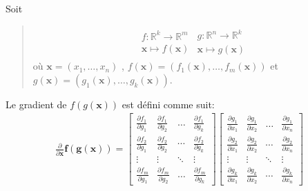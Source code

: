 \documentclass[letterpaper,11pt,english]{sphinxmanual}
\begin{document}
\begin{DUlineblock}{0em}
\item[] 
\item[] Soit
\end{DUlineblock}
\begin{quote}
\begin{equation}\label{equation:chapter2:chapter2:32}
\begin{split}\begin{array}{l}
f :\mathbb{R}^{k} \rightarrow\mathbb{R}^{m} \\
\mathbf{x} \mapsto f(\mathbf{x})
\end{array}
\begin{array}{l}
g :\mathbb{R}^{n} \rightarrow\mathbb{R}^{k} \\
\mathbf{x} \mapsto g(\mathbf{x})
\end{array}\end{split}
\end{equation}
\sphinxAtStartPar
où \(\mathbf{x}=(x_1,\dots,x_n)\) ,
\(f(\mathbf{x}) = (f_1(\mathbf{x}),\dots,f_m(\mathbf{x}))\) et
\(g(\mathbf{x}) = (g_1(\mathbf{x}),\dots,g_k(\mathbf{x}))\).
\end{quote}

\sphinxAtStartPar
Le gradient de \(f(g(\mathbf{x}))\) est défini comme suit:
\begin{equation}\label{equation:chapter2:chapter2:33}
\begin{split}\frac{\partial}{\partial \mathbf{x}} \mathbf{f}(\mathbf{g}(\mathbf{x}))=\left[\begin{array}{cccc}
\frac{\partial f_{1}}{\partial g_{1}} & \frac{\partial f_{1}}{\partial g_{2}} & \ldots & \frac{\partial f_{1}}{\partial g_{k}} \\
\frac{\partial f_{2}}{\partial g_{1}} & \frac{\partial f_{2}}{\partial g_{2}} & \cdots & \frac{\partial f_{2}}{\partial g_{k}} \\
\vdots &\vdots & \ddots & \vdots \\
\frac{\partial f_{m}}{\partial g_{1}} & \frac{\partial f_{m}}{\partial g_{2}} & \ldots & \frac{\partial f_{m}}{\partial g_{k}}
\end{array}\right]\left[\begin{array}{cccc}
\frac{\partial g_{1}}{\partial x_{1}} & \frac{\partial g_{1}}{\partial x_{2}} & \ldots & \frac{\partial g_{1}}{\partial x_{n}} \\
\frac{\partial g_{2}}{\partial x_{1}} & \frac{\partial g_{2}}{\partial x_{2}} & \cdots & \frac{\partial g_{2}}{\partial x_{n}} \\
\vdots &\vdots & \ddots & \vdots \\
\frac{\partial g_{k}}{\partial x_{1}} & \frac{\partial g_{k}}{\partial x_{2}} & \cdots & \frac{\partial g_{k}}{\partial x_{n}}
\end{array}\right]\end{split}
\end{equation}
\end{document}
